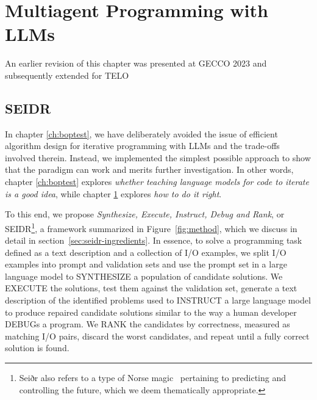 \chapter{Multiagent Programming with LLMs}
\label{ch:seidr}
\begin{remark}
  An earlier revision of this chapter was presented at GECCO 2023 \cite{liventsevFullyAutonomousProgramming2023} and subsequently extended for TELO \cite{grishinaFullyAutonomousProgramming2025}
\end{remark}

\section{SEIDR}
\label{sec:seidr-methodology}

In chapter \ref{ch:boptest}, we have deliberately avoided the issue of efficient algorithm design for iterative programming with LLMs and the trade-offs involved therein.
Instead, we implemented the simplest possible approach to show that the paradigm can work and merits further investigation.
In other words, chapter \ref{ch:boptest} explores \emph{whether teaching language models for code to iterate is a good idea}, while chapter \ref{ch:seidr} explores \emph{how to do it right}.

To this end, we propose \emph{Synthesize, Execute, Instruct, Debug and Rank}, or SEIDR\footnote{Seiðr also refers to a type of Norse magic~\cite{blain2002:nine} pertaining to predicting and controlling the future, which we deem thematically appropriate.}, a framework summarized in Figure~\ref{fig:method}, which we discuss in detail in section~\ref{sec:seidr-ingredients}.
In essence, to solve a programming task defined as a text description and a collection of I/O examples, we split I/O examples into prompt and validation sets and use the prompt set in a large language model to SYNTHESIZE a population of candidate solutions.
We EXECUTE the solutions, test them against the validation set, generate a text description of the identified problems used to INSTRUCT a large language model to produce repaired candidate solutions similar to the way a human developer DEBUGs a program.
We RANK the candidates
by correctness, measured as matching I/O pairs, discard the worst candidates, and repeat until a fully correct solution is found.

